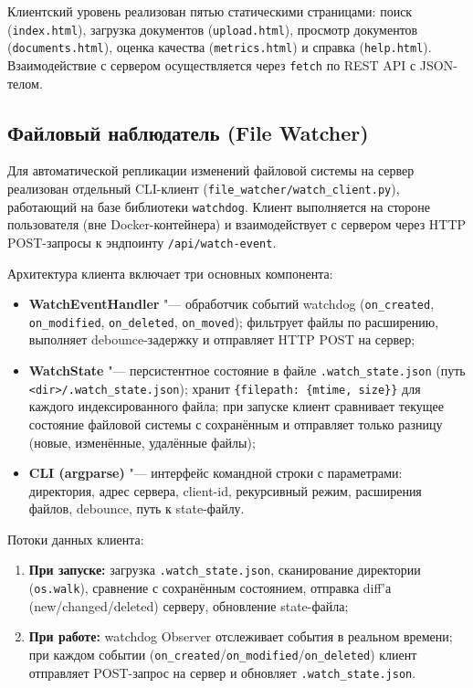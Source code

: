 Клиентский уровень реализован пятью статическими страницами: поиск (\texttt{index.html}),
загрузка документов (\texttt{upload.html}), просмотр документов (\texttt{documents.html}),
оценка качества (\texttt{metrics.html}) и справка (\texttt{help.html}). Взаимодействие
с сервером осуществляется через \texttt{fetch} по REST API с JSON-телом.

\subsection{Файловый наблюдатель (File Watcher)}

Для автоматической репликации изменений файловой системы на сервер реализован
отдельный CLI-клиент (\texttt{file\_watcher/watch\_client.py}), работающий на базе
библиотеки \texttt{watchdog}. Клиент выполняется на стороне пользователя (вне Docker-контейнера)
и взаимодействует с сервером через HTTP POST-запросы к эндпоинту \texttt{/api/watch-event}.

Архитектура клиента включает три основных компонента:

\begin{itemize}
	\item \textbf{WatchEventHandler} "--- обработчик событий watchdog (\texttt{on\_created}, \texttt{on\_modified}, \texttt{on\_deleted}, \texttt{on\_moved}); фильтрует файлы по расширению, выполняет debounce-задержку и отправляет HTTP POST на сервер;
	\item \textbf{WatchState} "--- персистентное состояние в файле \texttt{.watch\_state.json} (путь \texttt{<dir>/.watch\_state.json}); хранит \texttt{\{filepath: \{mtime, size\}\}} для каждого индексированного файла; при запуске клиент сравнивает текущее состояние файловой системы с сохранённым и отправляет только разницу (новые, изменённые, удалённые файлы);
	\item \textbf{CLI (argparse)} "--- интерфейс командной строки с параметрами: директория, адрес сервера, client-id, рекурсивный режим, расширения файлов, debounce, путь к state-файлу.
\end{itemize}

Потоки данных клиента:

\begin{enumerate}
	\item \textbf{При запуске:} загрузка \texttt{.watch\_state.json}, сканирование директории (\texttt{os.walk}), сравнение с сохранённым состоянием, отправка diff'а (new/changed/deleted) серверу, обновление state-файла;
	\item \textbf{При работе:} watchdog Observer отслеживает события в реальном времени; при каждом событии (\texttt{on\_created}/\texttt{on\_modified}/\texttt{on\_deleted}) клиент отправляет POST-запрос на сервер и обновляет \texttt{.watch\_state.json}.
\end{enumerate}


